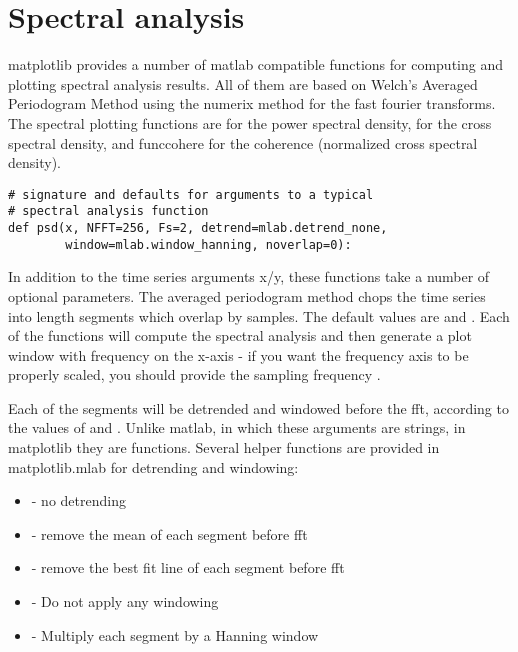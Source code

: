 \documentclass[]{book}
\begin{document}
\section{Spectral analysis}
\label{sec:spectral}

matplotlib provides a number of matlab compatible functions for
computing and plotting spectral analysis results.  All of them are
based on Welch's Averaged Periodogram Method \citep{BendatPiersol1986}
using the numerix  method for the fast fourier transforms.
The spectral plotting functions are  for the power spectral
density,  for the cross spectral density, and func{cohere}
for the coherence (normalized cross spectral density).  

\begin{lstlisting}  
# signature and defaults for arguments to a typical
# spectral analysis function
def psd(x, NFFT=256, Fs=2, detrend=mlab.detrend_none, 
        window=mlab.window_hanning, noverlap=0):
\end{lstlisting}

In addition to the time series arguments x/y, these functions take a
number of optional parameters.  The averaged periodogram method chops
the time series into  length segments which overlap by
 samples.  The default values are  and
.  Each of the functions will compute the spectral
analysis and then generate a plot window with frequency on the x-axis
- if you want the frequency axis to be properly scaled, you should
provide the sampling frequency .

Each of the segments will be detrended and windowed before the fft,
according to the values of  and .  Unlike
matlab, in which these arguments are strings, in matplotlib they are
functions.  Several helper functions are provided in matplotlib.mlab
for detrending and windowing: 

\begin{itemize}
\item {} - no detrending
\item {} - remove the mean of each segment before fft
\item {} - remove the best fit line of each segment
  before fft
\item {} - Do not apply any windowing
\item {} - Multiply each segment by a Hanning window

\end{itemize}
\end{document}
